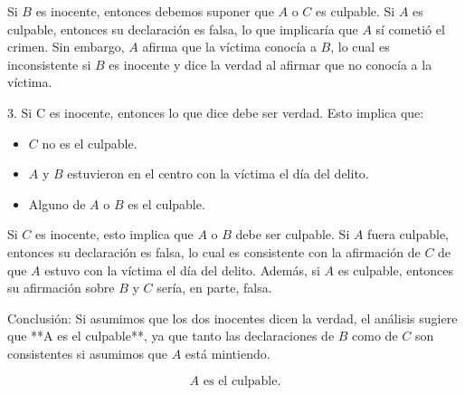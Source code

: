 \begin{solution}
   Si \( B \) es inocente, entonces debemos suponer que \( A \) o \( C \) es culpable. Si \( A \) es culpable, entonces su declaración es falsa, lo que implicaría que \( A \) sí cometió el crimen. Sin embargo, \( A \) afirma que la víctima conocía a \( B \), lo cual es inconsistente si \( B \) es inocente y dice la verdad al afirmar que no conocía a la víctima.

3. Si C es inocente, entonces lo que dice debe ser verdad. Esto implica que:
   \begin{itemize}
        \item \( C \) no es el culpable.
        \item \( A \) y \( B \) estuvieron en el centro con la víctima el día del delito.
        \item Alguno de \( A \) o \( B \) es el culpable.
   \end{itemize}

   Si \( C \) es inocente, esto implica que \( A \) o \( B \) debe ser culpable. Si \( A \) fuera culpable, entonces su declaración es falsa, lo cual es consistente con la afirmación de \( C \) de que \( A \) estuvo con la víctima el día del delito. Además, si \( A \) es culpable, entonces su afirmación sobre \( B \) y \( C \) sería, en parte, falsa.

Conclusión:
Si asumimos que los dos inocentes dicen la verdad, el análisis sugiere que **A es el culpable**, ya que tanto las declaraciones de \( B \) como de \( C \) son consistentes si asumimos que \( A \) está mintiendo.

\[
\boxed{A \text{ es el culpable.}}
\]
\end{solution}